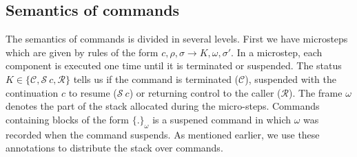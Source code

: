 \documentclass[12pt]{article}
\def\heap{\sigma}
\def\continue{{\mathcal{C}}}
\def\ret{{\mathcal{R}}}
\def\suspend{{\mathcal{S}}}
\begin{document}
\subsection{Semantics of commands}

The semantics of commands is divided in several levels. First we have microsteps which are given 
by rules of the form $c,\rho,\sigma \rightarrow K, \omega,\heap'$. In a microstep, each component
is executed one time until it is terminated or suspended.
The status $K \in\{\continue, \suspend~c, \ret\}$ tells us if the command is terminated ($\continue$), suspended
with the continuation $c$ to resume ($\suspend~c$) or returning control to the caller ($\ret$).
The frame $\omega$ denotes the part of the stack allocated during the micro-steps. Commands containing blocks
of the form $\{.\}_\omega$ is a suspened command in which $\omega$ was recorded when the command suspends. 
As mentioned earlier, we use these annotations to distribute the stack over commands.
\end{document}
